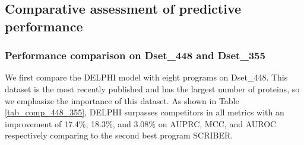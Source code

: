 \documentclass{bioinfo}
\begin{document}
\subsection{Comparative assessment of predictive performance}
\subsubsection{Performance comparison on Dset\_448 and Dset\_355}
We first compare the DELPHI model with eight programs on Dset\_448. This dataset is the most recently published and has the largest number of proteins, so we emphasize the importance of this dataset. As shown in Table \ref{tab_comp_448_355}, DELPHI surpasses competitors in all metrics with an improvement of 17.4\%, 18.3\%, and 3.08\% on AUPRC, MCC, and AUROC respectively comparing to the second best program SCRIBER.
\end{document}
